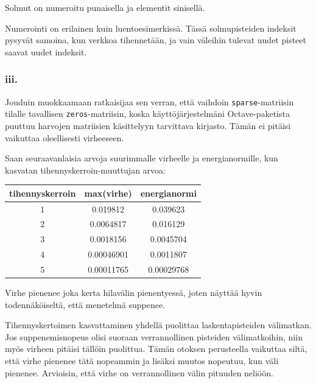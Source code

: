 \documentclass{article}
\begin{document}
Solmut on numeroitu punaisella ja elementit sinisellä.

Numerointi on erilainen kuin luentoesimerkissä. Tässä solmupisteiden indeksit
pysyvät samoina, kun verkkoa tihennetään, ja vain väleihin tulevat uudet pisteet
saavat uudet indeksit.

\subsubsection*{iii.}

Jouduin muokkaamaan ratkaisijaa sen verran, että vaihdoin
\verb#sparse#-matriisin tilalle tavallisen \verb#zeros#-matriisin, koska
käyttöjärjestelmäni Octave-paketista puuttuu harvojen matriisien käsittelyyn
tarvittava kirjasto. Tämän ei pitäisi vaikuttaa oleellisesti virheeseen.

Saan seuraavanlaisia arvoja suurimmalle virheelle ja energianormille,
kun kasvatan tihennyskerroin-muuttujan arvoa:

\begin{tabular}{ c c c }
  tihennyskerroin & max(virhe) & energianormi \\
  \hline
  1 & 0.019812 & 0.039623 \\
  2 & 0.0064817 & 0.016129 \\
  3 & 0.0018156 & 0.0045704 \\
  4 & 0.00046901 & 0.0011807 \\
  5 & 0.00011765 & 0.00029768 \\
\end{tabular}

Virhe pienenee joka kerta hilavälin pienentyessä, joten näyttää hyvin
todennäköiseltä, että menetel\-mä suppenee. 

Tihennyskertoimen kasvattaminen yhdellä puolittaa laskentapisteiden välimatkan.
Jos suppenemisnopeus olisi suoraan verrannollinen pisteiden välimatkoihin, niin
myös virheen pitäisi tällöin puolittua. Tämän otoksen perusteella vaikuttaa
siltä, että virhe pienenee tätä nopeammin ja lisäksi muutos nopeutuu, kun väli
pienenee. Arvioisin, että virhe on verrannollinen välin pituuden neliöön.
\end{document}
